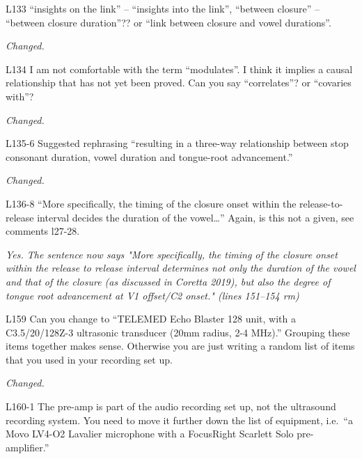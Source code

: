 \documentclass[]{article}
\begin{document}
L133 ``insights on the link'' -- ``insights into the link'', ``between
closure'' -- ``between closure duration''?? or ``link between closure
and vowel durations''.

\begin{adjustwidth}{1cm}{} \textit{
Changed.
} \end{adjustwidth}

L134 I am not comfortable with the term ``modulates''. I think it
implies a causal relationship that has not yet been proved. Can you say
``correlates''? or ``covaries with''?

\begin{adjustwidth}{1cm}{} \textit{
Changed.
} \end{adjustwidth}

L135-6 Suggested rephrasing ``resulting in a three-way relationship
between stop consonant duration, vowel duration and tongue-root
advancement.''

\begin{adjustwidth}{1cm}{} \textit{
Changed.
} \end{adjustwidth}

L136-8 ``More specifically, the timing of the closure onset within the
release-to-release interval decides the duration of the vowel\ldots{}''
Again, is this not a given, see comments l27-28.

\begin{adjustwidth}{1cm}{} \textit{
Yes. The sentence now says "More specifically, the timing of the closure onset within the release to release interval determines not only the duration of the vowel and that of the closure (as discussed in Coretta 2019), but also the degree of tongue root advancement at V1 offset/C2 onset." (lines 151--154 rm)
} \end{adjustwidth}

L159 Can you change to ``TELEMED Echo Blaster 128 unit, with a
C3.5/20/128Z-3 ultrasonic transducer (20mm radius, 2-4 MHz).'' Grouping
these items together makes sense. Otherwise you are just writing a
random list of items that you used in your recording set up.

\begin{adjustwidth}{1cm}{} \textit{
Changed.
} \end{adjustwidth}

L160-1 The pre-amp is part of the audio recording set up, not the
ultrasound recording system. You need to move it further down the list
of equipment, i.e.~``a Movo LV4-O2 Lavalier microphone with a FocusRight
Scarlett Solo pre-amplifier.''
\end{document}

